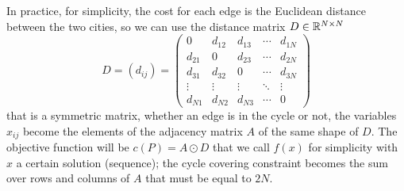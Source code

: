 In practice, for simplicity, the cost for each edge is the Euclidean distance between the two cities, so we can use the distance matrix $D\in\mathbb{R}^{N\times N}$
\[
D=(d_{ij})=
\begin{pmatrix} 
	0 & d_{12} & d_{13} & \cdots & d_{1N} \\
	d_{21} & 0 & d_{23} & \cdots & d_{2N} \\
	d_{31} & d_{32} & 0 & \cdots & d_{3N} \\
	\vdots & \vdots & \vdots & \ddots & \vdots \\
	d_{N1} & d_{N2} & d_{N3} & \cdots & 0
\end{pmatrix}
\]
that is a symmetric matrix, whether an edge is in the cycle or not, the variables $x_{ij}$ become the elements of the adjacency matrix $A$ of the same shape of $D$. The objective function will be $c(P)=A\odot D$ that we call $f(x)$ for simplicity with $x$ a certain solution (sequence); the cycle covering constraint becomes the sum over rows and columns of $A$ that must be equal to $2N$.






%
%


